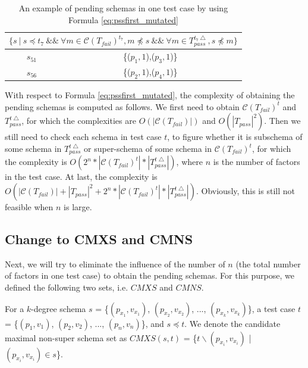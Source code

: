 \begin{table}[htbp]
  \centering
  \caption{An example of pending schemas in one test case by using Formula \ref{eq:pssfirst_mutated} }
  \label{ex:pendingschemasinonetestcaseusingfaultyandhealthy}
    \begin{tabular}{|c|c|} \hline
     \multicolumn{2}{|c|}{$\{ s\ |\ s \preceq t_{7}\ \&\&\ \forall m \in \mathcal{C}(T_{fail})^{t_{7}},  m \npreceq s  \ \&\&\  \forall m \in T_{pass}^{t_{7}\bigtriangleup}, s \npreceq m \} $} \\ \hline
   $s_{51}$ & \{($p_{1}, 1$),($p_{3}, 1$)\} \\
   $s_{56}$ & \{($p_{2}, 1$),($p_{4}, 1$)\} \\ \hline
    \end{tabular}%
\end{table}



With respect to Formula \ref{eq:pssfirst_mutated}, the complexity of obtaining the pending schemas is computed as follows. We first need to obtain $\mathcal{C}(T_{fail})^{t}$ and $T_{pass}^{t\bigtriangleup}$, for which the complexities are $O(|\mathcal{C}(T_{fail})|)$ and $O(|T_{pass}|^{2})$. Then we still need to check each schema in test case $t$, to figure whether it is subschema of some schema in $T_{pass}^{t\bigtriangleup}$ or super-schema of some schema in $\mathcal{C}(T_{fail})^{t}$, for which the complexity is $O(2^{n}* |\mathcal{C}(T_{fail})^{t}| * |T_{pass}^{t\bigtriangleup}|)$, where $n$ is the number of factors in the test case.  At last, the complexity is $O(|\mathcal{C}(T_{fail})| + |T_{pass}|^{2} + 2^{n}* |\mathcal{C}(T_{fail})^{t}| * |T_{pass}^{t\bigtriangleup}| )$. Obviously, this is still not feasible when $n$ is large.



\subsection{Change to CMXS and CMNS}

Next, we will try to eliminate the influence of the number of $n$ (the total number of factors in one test case) to obtain the pending schemas. For this purpose, we defined the following two sets, i.e. $CMXS$ and $CMNS$.

\begin{definition}
For a $k$-degree schema $s$ = \{$(p_{x_{1}}, v_{x_{1}})$, $(p_{x_{2}}, v_{x_{2}})$, ..., $(p_{x_{k}}, v_{x_{k}})$\}, a test case $t$ = \{$(p_{1}, v_{1})$, $(p_{2}, v_{2})$, ..., $(p_{n}, v_{n})$\}, and $s \preceq t$. We denote the candidate maximal non-super schema set as $CMXS(s,t)$ = \{$t \backslash (p_{x_{i}}, v_{x_{i}})$ | $(p_{x_{i}}, v_{x_{i}}) \in s $\}.
\end{definition}

